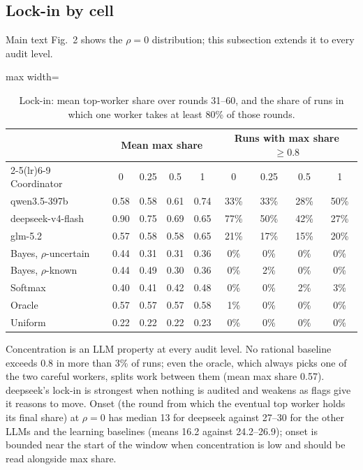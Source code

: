 \documentclass[11pt,letterpaper]{article}
\numberwithin{equation}{section}
\numberwithin{table}{section}
\numberwithin{figure}{section}
\numberwithin{algorithm}{section}
\begin{document}
\subsection{Lock-in by cell}\label{app:lockin}

Main text Fig.~2 shows the $\rho=0$ distribution; this subsection extends it to every audit level.

\begin{table}[h]
\centering\small
\caption{Lock-in: mean top-worker share over rounds 31--60, and the share of runs in which one worker takes at least 80\% of those rounds.}
\label{tab:lockin}
\begin{adjustbox}{max width=\linewidth}
\begin{tabular}{lcccccccc}
\toprule
 & \multicolumn{4}{c}{Mean max share} & \multicolumn{4}{c}{Runs with max share $\ge0.8$} \\
\cmidrule(lr){2-5}\cmidrule(lr){6-9}
Coordinator & 0 & 0.25 & 0.5 & 1 & 0 & 0.25 & 0.5 & 1 \\
\midrule
qwen3.5-397b & 0.58 & 0.58 & 0.61 & 0.74 & 33\% & 33\% & 28\% & 50\% \\
deepseek-v4-flash & 0.90 & 0.75 & 0.69 & 0.65 & 77\% & 50\% & 42\% & 27\% \\
glm-5.2 & 0.57 & 0.58 & 0.58 & 0.65 & 21\% & 17\% & 15\% & 20\% \\
\addlinespace
Bayes, $\rho$-uncertain & 0.44 & 0.31 & 0.31 & 0.36 & 0\% & 0\% & 0\% & 0\% \\
Bayes, $\rho$-known & 0.44 & 0.49 & 0.30 & 0.36 & 0\% & 2\% & 0\% & 0\% \\
Softmax & 0.40 & 0.41 & 0.42 & 0.48 & 0\% & 0\% & 2\% & 3\% \\
Oracle & 0.57 & 0.57 & 0.57 & 0.58 & 1\% & 0\% & 0\% & 0\% \\
Uniform & 0.22 & 0.22 & 0.22 & 0.23 & 0\% & 0\% & 0\% & 0\% \\
\bottomrule
\end{tabular}
\end{adjustbox}
\end{table}

\noindent Concentration is an LLM property at every audit level. No rational baseline exceeds 0.8 in more than 3\% of runs; even the oracle, which always picks one of the two careful workers, splits work between them (mean max share 0.57). deepseek's lock-in is strongest when nothing is audited and weakens as flags give it reasons to move. Onset (the round from which the eventual top worker holds its final share) at $\rho=0$ has median 13 for deepseek against 27--30 for the other LLMs and the learning baselines (means 16.2 against 24.2--26.9); onset is bounded near the start of the window when concentration is low and should be read alongside max share.
\end{document}
